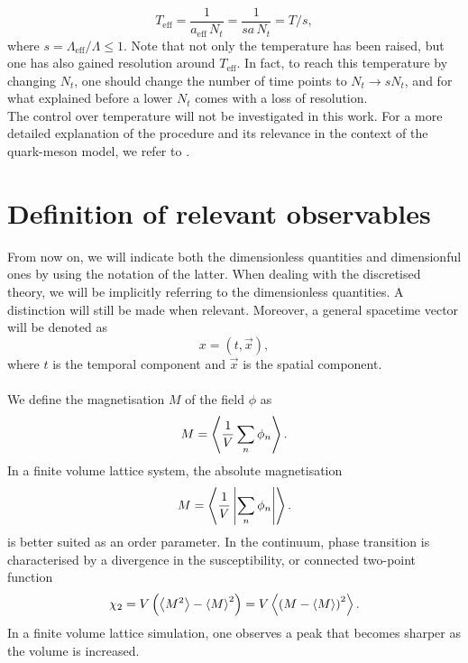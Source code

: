 \begin{equation*}
    T_\text{eff} = \frac{1}{a_\text{eff} \, N_t} = \frac{1}{sa \, N_t} = T / s, 
\end{equation*}
where $s = \Lambda_\text{eff} / \Lambda \leq 1$. Note that not only the temperature has been raised, but one has also gained resolution around $T_\text{eff}$. In fact, to reach this temperature by changing $N_t$, one should change the number of time points to $N_t \to s N_t$, and for what explained before a lower $N_t$ comes with a loss of resolution. \\
The control over temperature will not be investigated in this work. For a more detailed explanation of the procedure and its relevance in the context of the quark-meson model, we refer to \cite{attanasio2022low}.
\section{Definition of relevant observables}
\label{sec:observables}
From now on, we will indicate both the dimensionless quantities and dimensionful ones by using the notation of the latter. When dealing with the discretised theory, we will be implicitly referring to the dimensionless quantities. A distinction will still be made when relevant. Moreover, a general spacetime vector 
will be denoted as 
\begin{equation*}
    x = (t, \vec{x}),
\end{equation*}
where $t$ is the temporal component and $\vec{x}$ is the spatial component. \\~\\
We define the magnetisation $M$ of the field $\phi$ as
\begin{equation*}
    M = \left\langle \frac{1}{V}\sum_n \phi_n \right\rangle.
\end{equation*}
In a finite volume lattice system, the absolute magnetisation
\begin{equation*}
    M = \left\langle \frac{1}{V}\left|\sum_n \phi_n\right| \right\rangle.
\end{equation*}
is better suited \cite{friedli_velenik_2017,gattringer_LQCD} as an order parameter. 
In the continuum, phase transition is characterised by a divergence in the susceptibility, or connected two-point function
\begin{equation*}
    \chi_2 = V \left(\left\langle M^2 \right\rangle - \left\langle M \right\rangle^2\right) = V \left\langle \left(M-\left\langle M \right\rangle\right)^2 \right\rangle.
\end{equation*}
In a finite volume lattice simulation, one observes a peak that becomes sharper as the volume is increased. \\
